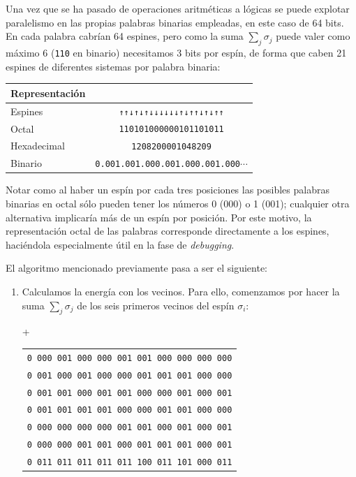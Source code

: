 \documentclass[11pt]{report}
\begin{document}
\begin{appendices}
Una vez que se ha pasado de operaciones aritméticas a lógicas se
puede explotar paralelismo en las propias palabras binarias
empleadas, en este caso de 64 bits. En cada palabra cabrían 64
espines, pero como la suma $\sum_{j}σ_j$ puede valer como máximo 6
(\texttt{110} en binario) necesitamos 3 bits por espín, de forma que caben 21
espines de diferentes sistemas por
palabra binaria\footnotemark:


\begin{center}
  \begin{tabular}{l|c}
    Representación &                                                \\ \hline
    Espines        & \texttt{↑↑↓↑↓↑↓↓↓↓↓↓↑↓↑↑↓↑↓↑↑}                 \\
    Octal          & \texttt{110101000000101101011}                 \\
    Hexadecimal    & \texttt{1208200001048209}                      \\
    Binario        & \texttt{0.001.001.000.001.000.001.000}$\cdots$ \\
  \end{tabular}
\end{center}


Notar como al haber un espín por cada tres posiciones las posibles
palabras binarias en octal sólo pueden tener los números 0 (000) o 1
(001); cualquier otra alternativa implicaría más de un espín por
posición. Por este motivo, la representación octal de las palabras
corresponde directamente a los espines, haciéndola especialmente útil
en la fase de \textit{debugging}.


El algoritmo mencionado previamente pasa a ser el siguiente:
\begin{enumerate}
\item Calculamos la energía con los vecinos. Para ello, comenzamos por
  hacer la suma $\sum_{j}σ_j$ de los seis primeros vecinos del espín $σ_i$:

  \begin{minipage}[lc]{1.0\linewidth}
    +
    \begin{tabular}{l}
     \texttt{0 000 001 000 000 001 001 000 000 000 000} \\
     \texttt{0 001 000 001 000 000 001 001 001 000 000} \\
     \texttt{0 001 001 000 001 001 000 000 001 000 001} \\
     \texttt{0 001 001 001 001 000 000 001 001 000 000} \\
     \texttt{0 000 000 000 000 001 001 000 001 000 001} \\
     \texttt{0 000 000 001 001 000 001 001 001 000 001} \\ \hline
     \texttt{0 011 011 011 011 011 100 011 101 000 011} \\
    \end{tabular}
  \end{minipage}


\end{enumerate}
\end{appendices}
\end{document}
